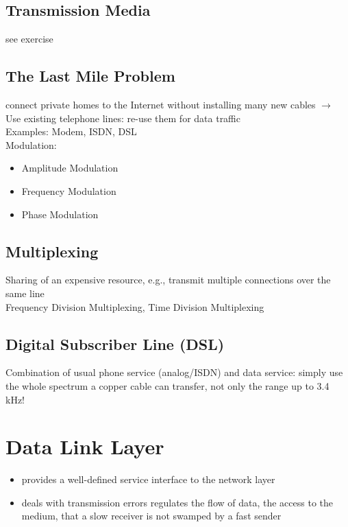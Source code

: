 \documentclass[11pt,ngerman]{article}
\begin{document}
\subsection{Transmission	Media}
see exercise
\subsection{The	Last	Mile	Problem}
connect	private	homes	to	
the	Internet	without	installing	many	new	cables $\rightarrow$ Use	existing	telephone	lines:	re-use	them	for	data	
traffic\\

Examples: Modem, ISDN, DSL\\

Modulation:
\begin{itemize}[noitemsep,nolistsep]
\item Amplitude Modulation
\item Frequency Modulation
\item Phase Modulation
\end{itemize}

\subsection{Multiplexing}
Sharing	of	an	expensive	resource,	e.g.,	transmit	multiple	connections	over	
the	same	line\\
Frequency	Division	Multiplexing, Time	Division	Multiplexing

\subsection{Digital	Subscriber	Line	(DSL)}
Combination	of	usual	phone	service	
(analog/ISDN)	and	data	service: 
simply	use	the	whole	spectrum	a	copper	
cable	can	transfer,	not	only	the	range	up	to	
3.4	kHz!


\section{Data Link Layer}

\begin{itemize}[noitemsep,nolistsep]
\item provides	a	well-defined	service	
interface	to	the	network	layer
\item deals	with	transmission	errors
regulates
the	flow	of	data, 
the	access	to	the	medium, 
that	a	slow	receiver	is	not	swamped	by	
a	fast	sender
\end{itemize}
\end{document}
